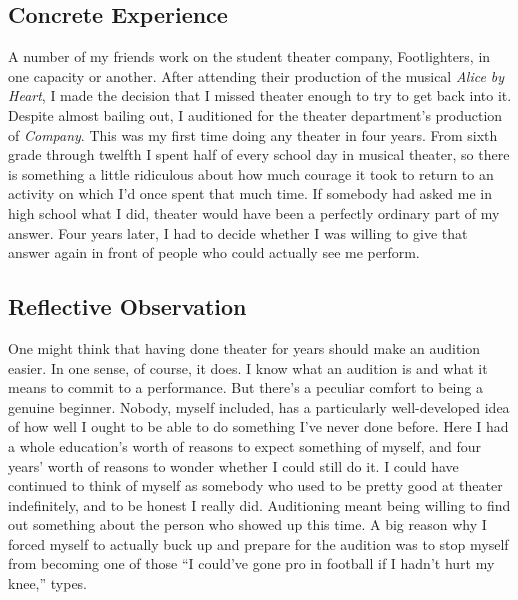 \documentclass[12pt,letterpaper]{article}
\begin{document}
\subsection{Concrete Experience}
A number of my friends work on the student theater company, Footlighters, in one capacity or another.
After attending their production of the musical \textit{Alice by Heart}, I made the decision that I missed theater enough to try to get back into it.
Despite almost bailing out, I auditioned for the theater department's production of \textit{Company}. This was my first time doing any theater in four years. From sixth grade through twelfth I spent half of every school day in musical theater, so there is something a little ridiculous about how much courage it took to return to an activity on which I'd once spent that much time. If somebody had asked me in high school what I did, theater would have been a perfectly ordinary part of my answer. Four years later, I had to decide whether I was willing to give that answer again in front of people who could actually see me perform.

\subsection{Reflective Observation}
One might think that having done theater for years should make an audition easier. In one sense, of course, it does. I know what an audition is and what it means to commit to a performance. But there's a peculiar comfort to being a genuine beginner. Nobody, myself included, has a particularly well-developed idea of how well I ought to be able to do something I've never done before. Here I had a whole education's worth of reasons to expect something of myself, and four years' worth of reasons to wonder whether I could still do it. I could have continued to think of myself as somebody who used to be pretty good at theater indefinitely, and to be honest I really did. Auditioning meant being willing to find out something about the person who showed up this time.
A big reason why I forced myself to actually buck up and prepare for the audition was to stop myself from becoming one of those ``I could've gone pro in football if I hadn't hurt my knee,'' types.
\end{document}
